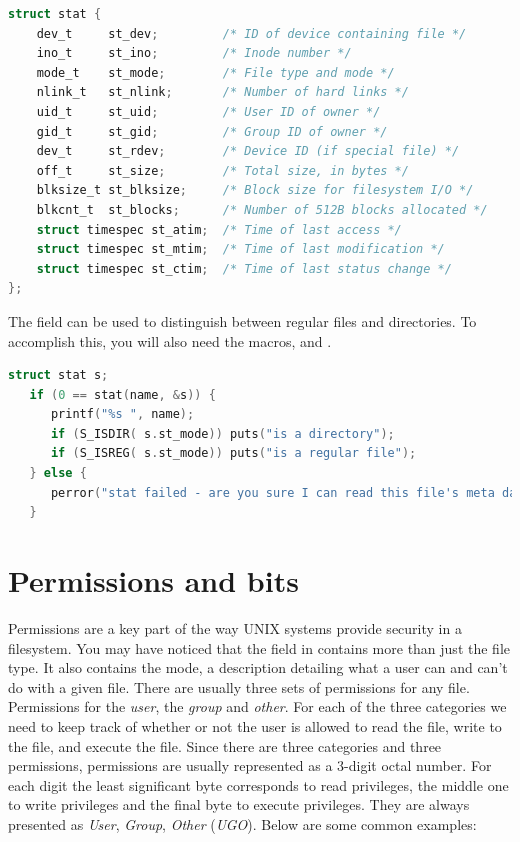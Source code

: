 \begin{lstlisting}[language=C]
struct stat {
    dev_t     st_dev;         /* ID of device containing file */
    ino_t     st_ino;         /* Inode number */
    mode_t    st_mode;        /* File type and mode */
    nlink_t   st_nlink;       /* Number of hard links */
    uid_t     st_uid;         /* User ID of owner */
    gid_t     st_gid;         /* Group ID of owner */
    dev_t     st_rdev;        /* Device ID (if special file) */
    off_t     st_size;        /* Total size, in bytes */
    blksize_t st_blksize;     /* Block size for filesystem I/O */
    blkcnt_t  st_blocks;      /* Number of 512B blocks allocated */
    struct timespec st_atim;  /* Time of last access */
    struct timespec st_mtim;  /* Time of last modification */
    struct timespec st_ctim;  /* Time of last status change */
};
\end{lstlisting}

The  field can be used to distinguish between regular files and directories. To accomplish this, you will also need the macros,  and .

\begin{lstlisting}[language=C]
   struct stat s;
   if (0 == stat(name, &s)) {
      printf("%s ", name);
      if (S_ISDIR( s.st_mode)) puts("is a directory");
      if (S_ISREG( s.st_mode)) puts("is a regular file");
   } else {
      perror("stat failed - are you sure I can read this file's meta data?");
   }
\end{lstlisting}

\section{Permissions and bits}

Permissions are a key part of the way UNIX systems provide security in a filesystem. You may have noticed that the  field in  contains more than just the file type. It also contains the mode, a description detailing what a user can and can't do with a given file. There are usually three sets of permissions for any file. Permissions for the \emph{user}, the \emph{group} and \emph{other}. For each of the three categories we need to keep track of whether or not the user is allowed to read the file, write to the file, and execute the file. Since there are three categories and three permissions, permissions are usually represented as a 3-digit octal number. For each digit the least significant byte corresponds to read privileges, the middle one to write privileges and the final byte to execute privileges. They are always presented as \emph{User}, \emph{Group}, \emph{Other} (\emph{UGO}). Below are some common examples:

